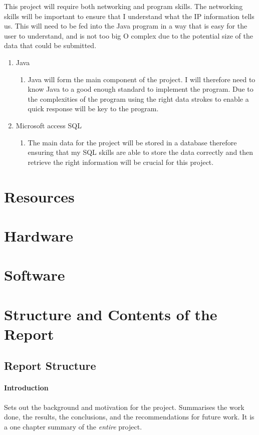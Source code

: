 This project will require both networking and program skills. The networking skills will be important to ensure that I understand what the IP information tells us. This will need to be fed into the Java program in a way that is easy for the user to understand, and is not too big O complex due to the potential size of the data that could be submitted. 
\begin{enumerate}
\item Java 
\begin{enumerate}
    \item Java will form the main component of the project. I will therefore need to know Java to a good enough standard to implement the program. Due to the complexities of the program using the right data strokes to enable a quick response will be key to the program. 
\end{enumerate}
\item Microsoft access SQL
\begin{enumerate}
    \item The main data for the project will be stored in a database therefore ensuring that my SQL skills are able to store the data correctly and then retrieve the right information will be crucial for this project. 
\end{enumerate}
\end{enumerate}

\section*{Resources}

\section*{Hardware}

\section*{Software}

\section*{Structure and Contents of the Report}
\subsection*{Report Structure}

\paragraph{Introduction}  Sets out the background and motivation for the project.  Summarises the work done, the results, the conclusions, and the recommendations for future work.  It is a one chapter summary of the \emph{entire} project.

